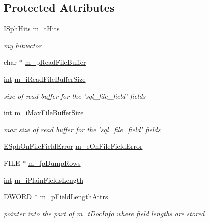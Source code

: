 \subsection*{Protected Attributes}
\begin{DoxyCompactItemize}
\item 
\hyperlink{classISphHits}{I\-Sph\-Hits} \hyperlink{classCSphSource__Document_ab449c37abdd009d23e789d777f8f51a0}{m\-\_\-t\-Hits}
\begin{DoxyCompactList}\small\item\em my hitvector \end{DoxyCompactList}\item 
char $\ast$ \hyperlink{classCSphSource__Document_a3a9170d3ee94eb5718382d06eabbdb2b}{m\-\_\-p\-Read\-File\-Buffer}
\item 
\hyperlink{sphinxexpr_8cpp_a4a26e8f9cb8b736e0c4cbf4d16de985e}{int} \hyperlink{classCSphSource__Document_a860f2fd7fd8abab148012b0a095397f1}{m\-\_\-i\-Read\-File\-Buffer\-Size}
\begin{DoxyCompactList}\small\item\em size of read buffer for the 'sql\-\_\-file\-\_\-field' fields \end{DoxyCompactList}\item 
\hyperlink{sphinxexpr_8cpp_a4a26e8f9cb8b736e0c4cbf4d16de985e}{int} \hyperlink{classCSphSource__Document_af05ec3addb79f4ed6fac43eff673d381}{m\-\_\-i\-Max\-File\-Buffer\-Size}
\begin{DoxyCompactList}\small\item\em max size of read buffer for the 'sql\-\_\-file\-\_\-field' fields \end{DoxyCompactList}\item 
\hyperlink{sphinx_8h_ac6ec6f15ff9fc4c04126351b336cfe3d}{E\-Sph\-On\-File\-Field\-Error} \hyperlink{classCSphSource__Document_a06236c659df9157d586d19e52516d087}{m\-\_\-e\-On\-File\-Field\-Error}
\item 
F\-I\-L\-E $\ast$ \hyperlink{classCSphSource__Document_a7b400af737e43a6a327296b76ca0e3b6}{m\-\_\-fp\-Dump\-Rows}
\item 
\hyperlink{sphinxexpr_8cpp_a4a26e8f9cb8b736e0c4cbf4d16de985e}{int} \hyperlink{classCSphSource__Document_ac7732cb92e94e5f27b887666efc94138}{m\-\_\-i\-Plain\-Fields\-Length}
\item 
\hyperlink{sphinxstd_8h_a798af1e30bc65f319c1a246cecf59e39}{D\-W\-O\-R\-D} $\ast$ \hyperlink{classCSphSource__Document_a6b5b9938dada2b74d8dcd4f3172e5d3b}{m\-\_\-p\-Field\-Length\-Attrs}
\begin{DoxyCompactList}\small\item\em pointer into the part of m\-\_\-t\-Doc\-Info where field lengths are stored \end{DoxyCompactList}\item 

\end{DoxyCompactItemize}
